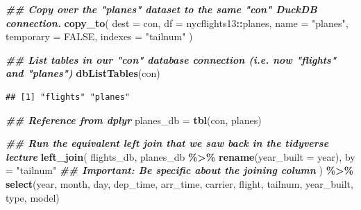 \documentclass[
]{article}
\newenvironment{Shaded}{\begin{snugshade}}{\end{snugshade}}
\newcommand{\AttributeTok}[1]{\textcolor[rgb]{0.13,0.29,0.53}{#1}}
\newcommand{\ConstantTok}[1]{\textcolor[rgb]{0.56,0.35,0.01}{#1}}
\newcommand{\DocumentationTok}[1]{\textcolor[rgb]{0.56,0.35,0.01}{\textbf{\textit{#1}}}}
\newcommand{\FunctionTok}[1]{\textcolor[rgb]{0.13,0.29,0.53}{\textbf{#1}}}
\newcommand{\NormalTok}[1]{#1}
\newcommand{\OtherTok}[1]{\textcolor[rgb]{0.56,0.35,0.01}{#1}}
\newcommand{\SpecialCharTok}[1]{\textcolor[rgb]{0.81,0.36,0.00}{\textbf{#1}}}
\newcommand{\StringTok}[1]{\textcolor[rgb]{0.31,0.60,0.02}{#1}}
\begin{document}
\begin{Shaded}
\begin{Highlighting}[]
\DocumentationTok{\#\# Copy over the "planes" dataset to the same "con" DuckDB connection.}
\FunctionTok{copy\_to}\NormalTok{(}
    \AttributeTok{dest =}\NormalTok{ con, }
    \AttributeTok{df =}\NormalTok{ nycflights13}\SpecialCharTok{::}\NormalTok{planes, }
    \AttributeTok{name =} \StringTok{"planes"}\NormalTok{,}
    \AttributeTok{temporary =} \ConstantTok{FALSE}\NormalTok{, }
    \AttributeTok{indexes =} \StringTok{"tailnum"}
\NormalTok{    )}

\DocumentationTok{\#\# List tables in our "con" database connection (i.e. now "flights" and "planes")}
\FunctionTok{dbListTables}\NormalTok{(con)}
\end{Highlighting}
\end{Shaded}

\begin{verbatim}
## [1] "flights" "planes"
\end{verbatim}

\begin{Shaded}
\begin{Highlighting}[]
\DocumentationTok{\#\# Reference from dplyr}
\NormalTok{planes\_db }\OtherTok{=} \FunctionTok{tbl}\NormalTok{(con, }\StringTok{\textquotesingle{}planes\textquotesingle{}}\NormalTok{)}

\DocumentationTok{\#\# Run the equivalent left join that we saw back in the tidyverse lecture}
\FunctionTok{left\_join}\NormalTok{(}
\NormalTok{    flights\_db,}
\NormalTok{    planes\_db }\SpecialCharTok{\%\textgreater{}\%} \FunctionTok{rename}\NormalTok{(}\AttributeTok{year\_built =}\NormalTok{ year),}
    \AttributeTok{by =} \StringTok{"tailnum"} \DocumentationTok{\#\# Important: Be specific about the joining column}
\NormalTok{) }\SpecialCharTok{\%\textgreater{}\%}
    \FunctionTok{select}\NormalTok{(year, month, day, dep\_time, arr\_time, carrier, flight, tailnum,}
\NormalTok{           year\_built, type, model) }
\end{Highlighting}
\end{Shaded}
\end{document}
